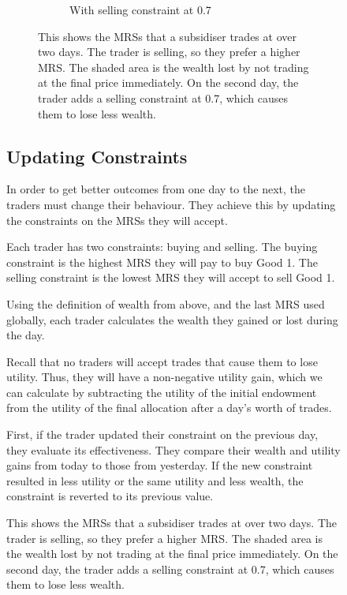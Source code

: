 \documentclass[12pt,a4paper,titlepage]{article}
\begin{document}
\begin{figure}[H]
\begin{figure}[t]
\begin{subfigure}{.4\linewidth}
    \caption{With selling constraint at 0.7}
  \end{subfigure}%
  
  \caption{
    This shows the MRSs that a subsidiser trades at over two days.
    The trader is selling, so they prefer a higher MRS.
    The shaded area is the wealth lost by not trading at the final price immediately.
    On the second day, the trader adds a selling constraint at 0.7, which causes them to lose less wealth.
  }
  \label{fig:wealth}
\end{figure}

\subsection{Updating Constraints}
In order to get better outcomes from one day to the next, the traders must change their behaviour.
They achieve this by updating the constraints on the MRSs they will accept.

Each trader has two constraints: buying and selling.
The buying constraint is the highest MRS they will pay to buy Good 1.
The selling constraint is the lowest MRS they will accept to sell Good 1.

Using the definition of wealth from above, and the last MRS used globally, each trader calculates the wealth they gained or lost during the day.

Recall that no traders will accept trades that cause them to lose utility. 
Thus, they will have a non-negative utility gain, which we can calculate by subtracting the utility of the initial endowment from the utility of the final allocation after a day's worth of trades.

First, if the trader updated their constraint on the previous day, they evaluate its effectiveness.
They compare their wealth and utility gains from today to those from yesterday.
If the new constraint resulted in less utility or the same utility and less wealth, the constraint is reverted to its previous value.


\end{figure}
\end{document}
